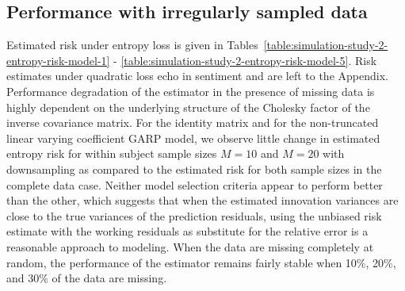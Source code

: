 %
\subsection{Performance with irregularly sampled data}
%

Estimated risk under entropy loss is given in Tables~\ref{table:simulation-study-2-entropy-risk-model-1} - \ref{table:simulation-study-2-entropy-risk-model-5}.  Risk estimates under quadratic loss echo in sentiment and are left to the Appendix.  Performance degradation of the estimator in the presence of missing data is highly dependent on the underlying structure of the Cholesky factor of the inverse covariance matrix. For the identity matrix and for the non-truncated linear varying coefficient GARP model, we observe little change in estimated entropy risk for within subject sample sizes $M = 10$ and $M = 20$ with downsampling as compared to the estimated risk for both sample sizes in the complete data case.  Neither model selection criteria appear to perform better than the other, which suggests that when the estimated innovation variances are close to the true variances of the prediction residuals, using the unbiased risk estimate with the working residuals as substitute for the relative error is a reasonable approach to modeling. When the data are missing completely at random, the performance of the estimator remains fairly stable when 10\%, 20\%, and 30\% of the data are missing. 

